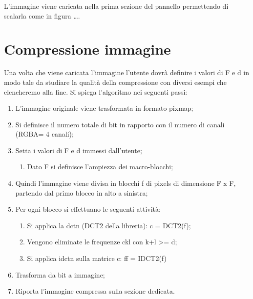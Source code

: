 \documentclass[12pt]{article}
\begin{document}
	L’immagine viene caricata nella prima sezione del pannello permettendo di scalarla come in figura ….

\section{Compressione immagine}
	Una volta che viene caricata l’immagine l’utente dovrà definire i valori di F e d in modo tale da studiare la qualità della compressione con diversi esempi che elencheremo alla fine.\newline
	Si spiega l’algoritmo nei seguenti passi:
	\begin{enumerate}
			\item L’immagine originale viene trasformata in formato pixmap;
			\item Si definisce il numero totale di bit in rapporto con il numero di canali (RGBA= 4 canali);
			\item Setta i valori di F e d immessi dall’utente;
				\begin{enumerate}[label=\Alph*]
					\item Dato F si definisce l’ampiezza dei macro-blocchi;
				\end{enumerate}
			\item Quindi l’immagine viene divisa in blocchi f di pixels di dimensione F x F, partendo dal primo blocco in alto a sinistra;
			\item Per ogni blocco si effettuano le seguenti attività:
				\begin{enumerate}[label=\Alph*]
					\item Si applica la dctn (DCT2 della libreria): c = DCT2(f);
					\item Vengono eliminate le frequenze ckl con k+l >= d;
					\item Si applica idctn sulla matrice c: ff = IDCT2(f)
				\end{enumerate}
			\item Trasforma da bit a immagine;
			\item Riporta l’immagine compressa sulla sezione dedicata.
	\end{enumerate}
\end{document}
